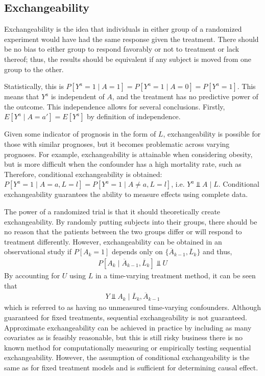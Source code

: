 \subsection{Exchangeability} \label{exchangeability} 
Exchangeability is the idea that individuals in either group of a randomized experiment would have had the same response given the treatment. \cite{hernan_robins_2016}  There should be no bias to either group to respond favorably or not to treatment or lack thereof; thus, the results should be equivalent if any subject is moved from one group to the other.  
 
Statistically, this is $P[Y^a = 1 \mid A = 1] = P[Y^a = 1 \mid A = 0] = P[Y^a = 1]$.  This means that $Y^a$ is independent of $A$, and the treatment has no predictive power of the outcome.  This independence allows for several conclusions.  Firstly, $E[Y^a \mid A = a'] = E[Y^a]$ by definition of independence.  

Given some indicator of prognosis in the form of $L$, exchangeability is possible for those with similar prognoses, but it becomes problematic across varying prognoses.  For example, exchangeability is attainable when considering obesity, but is more difficult when the confounder has a high mortality rate, such as    Therefore, conditional exchangeability is obtained: $P[Y^a = 1 \mid A = a, L=l] = P[Y^a = 1 \mid A \neq a, L=l]$, i.e. $Y^{a} \Perp A\mid L$. \cite{hernan_robins_2016}  Conditional exchangeability guarantees the ability to measure effects using complete data.  

The power of a randomized trial is that it should theoretically create exchangeability.  By randomly putting subjects into their groups, there should be no reason that the patients between the two groups differ or will respond to treatment differently.  However, exchangeability can be obtained in an observational study if $P[A_k = 1]$ depends only on $\{\overline{A}_{k-1}, \overline{L}_{k} \}$ and thus, 
\begin{align}
P[A_k \mid \overline{A}_{k-1}, \overline{L}_{k} ] \Perp U
\end{align}
By accounting for $U$ using $L$ in a time-varying treatment method, it can be seen that 
\begin{align} 
Y \Perp A_k \mid  \overline{L}_{k}, \overline{A}_{k-1}
\end{align}
which is referred to as having no unmeasured time-varying confounders.  Although guaranteed for fixed treatments, sequential exchangeability is not guaranteed.\cite{wright2015international}  Approximate exchangeability can be achieved in practice by including as many covariates as is feasibly reasonable, but this is still risky business there is no known method for computationally measuring or empirically testing sequential exchangeability.  However, the assumption of conditional exchangeability is the same as for fixed treatment models and is sufficient for determining causal effect. 

